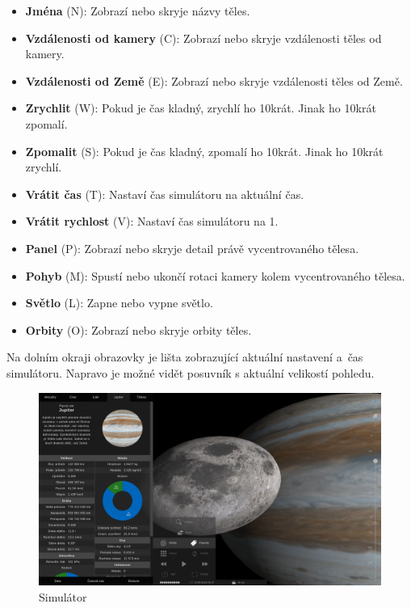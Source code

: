 \documentclass[a4paper,12pt]{article}
\begin{document}
\begin{itemize}
\item \textbf{Jména} (N): Zobrazí nebo skryje názvy těles.
\item \textbf{Vzdálenosti od kamery} (C): Zobrazí nebo skryje vzdálenosti těles od kamery.
\item \textbf{Vzdálenosti od Země} (E): Zobrazí nebo skryje vzdálenosti těles od Země.
\item \textbf{Zrychlit} (W): Pokud je čas kladný, zrychlí ho 10krát. Jinak ho 10krát zpomalí.
\item \textbf{Zpomalit} (S): Pokud je čas kladný, zpomalí ho 10krát. Jinak ho 10krát zrychlí.
\item \textbf{Vrátit čas} (T): Nastaví čas simulátoru na aktuální čas.
\item \textbf{Vrátit rychlost} (V): Nastaví čas simulátoru na 1.
\item \textbf{Panel} (P): Zobrazí nebo skryje detail právě vycentrovaného tělesa.
\item \textbf{Pohyb} (M): Spustí nebo ukončí rotaci kamery kolem vycentrovaného tělesa.
\item \textbf{Světlo} (L): Zapne nebo vypne světlo.
\item \textbf{Orbity} (O): Zobrazí nebo skryje orbity těles.
\end{itemize}

Na dolním okraji obrazovky je lišta zobrazující aktuální nastavení a~čas simulátoru. Napravo je možné vidět posuvník s aktuální velikostí pohledu.

\begin{figure}[H]
\begin{center}
\includegraphics[width=450pt]{Images/Simulator.png}
\caption{Simulátor}
\label{BodiesList}
\end{center}
\end{figure}
\end{document}
